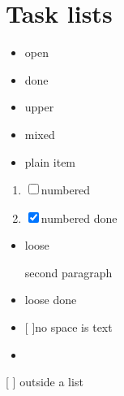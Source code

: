 \section{Task lists}\label{task-lists}

\begin{itemize}
\item[$\square$]
  open
\item[$\boxtimes$]
  done
\item[$\boxtimes$]
  upper
\item[$\square$]
  mixed
\item
  plain item
\end{itemize}

\begin{enumerate}
\def\labelenumi{\arabic{enumi}.}
\tightlist
\item
  ☐ numbered
\item
  ☒ numbered done
\end{enumerate}

\begin{itemize}
\item[$\square$]
  loose

  second paragraph
\item[$\boxtimes$]
  loose done
\item
  {[} {]}no space is text
\item[$\square$]
\end{itemize}

{[} {]} outside a list
